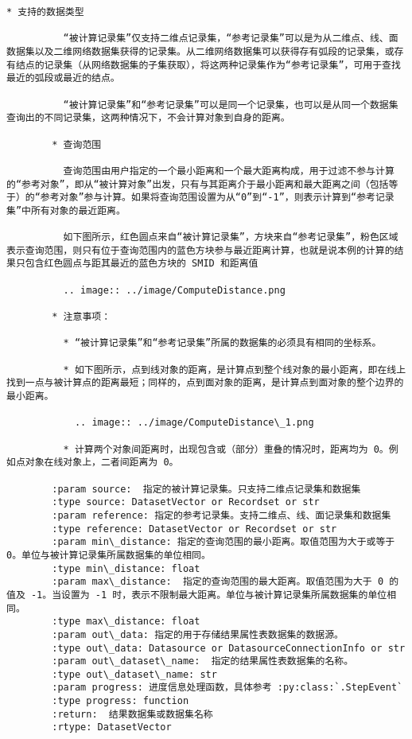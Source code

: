 \documentclass[11pt]{article}
\begin{document}
\begin{Verbatim}[commandchars=\\\{\}]
        * 支持的数据类型
        
          “被计算记录集”仅支持二维点记录集，“参考记录集”可以是为从二维点、线、面数据集以及二维网络数据集获得的记录集。从二维网络数据集可以获得存有弧段的记录集，或存有结点的记录集（从网络数据集的子集获取），将这两种记录集作为“参考记录集”，可用于查找最近的弧段或最近的结点。
        
          “被计算记录集”和“参考记录集”可以是同一个记录集，也可以是从同一个数据集查询出的不同记录集，这两种情况下，不会计算对象到自身的距离。
        
        * 查询范围
        
          查询范围由用户指定的一个最小距离和一个最大距离构成，用于过滤不参与计算的“参考对象”，即从“被计算对象”出发，只有与其距离介于最小距离和最大距离之间（包括等于）的“参考对象”参与计算。如果将查询范围设置为从“0”到“-1”，则表示计算到“参考记录集”中所有对象的最近距离。
        
          如下图所示，红色圆点来自“被计算记录集”，方块来自“参考记录集”，粉色区域表示查询范围，则只有位于查询范围内的蓝色方块参与最近距离计算，也就是说本例的计算的结果只包含红色圆点与距其最近的蓝色方块的 SMID 和距离值
        
          .. image:: ../image/ComputeDistance.png
        
        * 注意事项：
        
          * “被计算记录集”和“参考记录集”所属的数据集的必须具有相同的坐标系。
        
          * 如下图所示，点到线对象的距离，是计算点到整个线对象的最小距离，即在线上找到一点与被计算点的距离最短；同样的，点到面对象的距离，是计算点到面对象的整个边界的最小距离。
        
            .. image:: ../image/ComputeDistance\_1.png
        
          * 计算两个对象间距离时，出现包含或（部分）重叠的情况时，距离均为 0。例如点对象在线对象上，二者间距离为 0。
        
        :param source:  指定的被计算记录集。只支持二维点记录集和数据集
        :type source: DatasetVector or Recordset or str
        :param reference: 指定的参考记录集。支持二维点、线、面记录集和数据集
        :type reference: DatasetVector or Recordset or str
        :param min\_distance: 指定的查询范围的最小距离。取值范围为大于或等于 0。单位与被计算记录集所属数据集的单位相同。
        :type min\_distance: float
        :param max\_distance:  指定的查询范围的最大距离。取值范围为大于 0 的值及 -1。当设置为 -1 时，表示不限制最大距离。单位与被计算记录集所属数据集的单位相同。
        :type max\_distance: float
        :param out\_data: 指定的用于存储结果属性表数据集的数据源。
        :type out\_data: Datasource or DatasourceConnectionInfo or str
        :param out\_dataset\_name:  指定的结果属性表数据集的名称。
        :type out\_dataset\_name: str
        :param progress: 进度信息处理函数，具体参考 :py:class:`.StepEvent`
        :type progress: function
        :return:  结果数据集或数据集名称
        :rtype: DatasetVector
    

\end{Verbatim}
\end{document}
